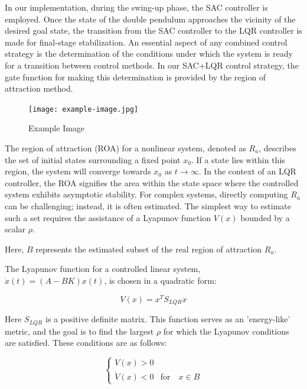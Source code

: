 In our implementation, during the swing-up phase, the SAC controller is employed. Once the state of the double pendulum approaches the vicinity of the desired goal state, the transition from the SAC controller to the LQR controller is made for final-stage stabilization. An essential aspect of any combined control strategy is the determination of the conditions under which the system is ready for a transition between control methods. In our SAC+LQR control strategy, the gate function for making this determination is provided by the region of attraction method\cite{maywald2022co}.

\begin{figure}[ht]
    \centering
    \texttt{[image: example-image.jpg]}
    \caption{Example Image}
    \label{fig:example}
\end{figure}


The region of attraction (ROA) for a nonlinear system, denoted as \(R_a\), describes the set of initial states surrounding a fixed point \(x_0\). If a state lies within this region, the system will converge towards \(x_0\) as \(t \rightarrow \infty\). In the context of an LQR controller, the ROA signifies the area within the state space where the controlled system exhibits asymptotic stability. For complex systems, directly computing \(R_a\) can be challenging; instead, it is often estimated. The simplest way to estimate such a set requires the assistance of a Lyapunov function \(V(x)\) bounded by a scalar \(\rho\)\cite{khalil2002nonlinear}.

Here, \(B\) represents the estimated subset of the real region of attraction \(R_a\).

The Lyapunov function for a controlled linear system, \(\dot{x}(t) = (A - BK)x(t)\), is chosen in a quadratic form:

\begin{equation}
  V(x) = x^T S_{LQR} x 
  \label{eq:V}
\end{equation}

Here \(S_{LQR}\) is a positive definite matrix. This function serves as an 'energy-like' metric, and the goal is to find the largest \(\rho\) for which the Lyapunov conditions are satisfied. These conditions are as follows:

\begin{equation}
\begin{cases}
   V(x) > 0 \\
   \dot{V}(x) < 0 & \text{for} \quad x \in B
\end{cases}
\label{eq:V_conditions}
\end{equation}

